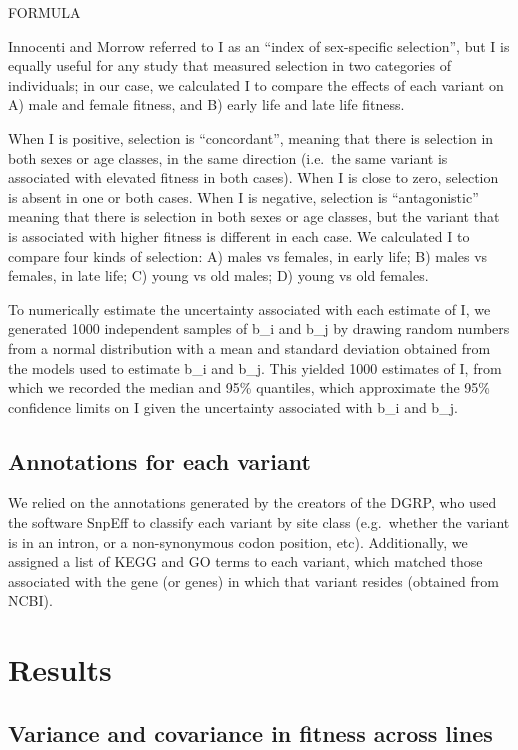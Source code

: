 \documentclass{article}
\begin{document}
FORMULA

Innocenti and Morrow referred to I as an ``index of sex-specific
selection'', but I is equally useful for any study that measured
selection in two categories of individuals; in our case, we calculated I
to compare the effects of each variant on A) male and female fitness,
and B) early life and late life fitness.

When I is positive, selection is ``concordant'', meaning that there is
selection in both sexes or age classes, in the same direction (i.e.~the
same variant is associated with elevated fitness in both cases). When I
is close to zero, selection is absent in one or both cases. When I is
negative, selection is ``antagonistic'' meaning that there is selection
in both sexes or age classes, but the variant that is associated with
higher fitness is different in each case. We calculated I to compare
four kinds of selection: A) males vs females, in early life; B) males vs
females, in late life; C) young vs old males; D) young vs old females.

To numerically estimate the uncertainty associated with each estimate of
I, we generated 1000 independent samples of b\_i and b\_j by drawing
random numbers from a normal distribution with a mean and standard
deviation obtained from the models used to estimate b\_i and b\_j. This
yielded 1000 estimates of I, from which we recorded the median and 95\%
quantiles, which approximate the 95\% confidence limits on I given the
uncertainty associated with b\_i and b\_j.

\subsection*{Annotations for each variant}

We relied on the annotations generated by the creators of the DGRP, who
used the software SnpEff to classify each variant by site class
(e.g.~whether the variant is in an intron, or a non-synonymous codon
position, etc). Additionally, we assigned a list of KEGG and GO terms to
each variant, which matched those associated with the gene (or genes) in
which that variant resides (obtained from NCBI).

\section*{Results}

\subsection*{Variance and covariance in fitness across lines}
\end{document}
